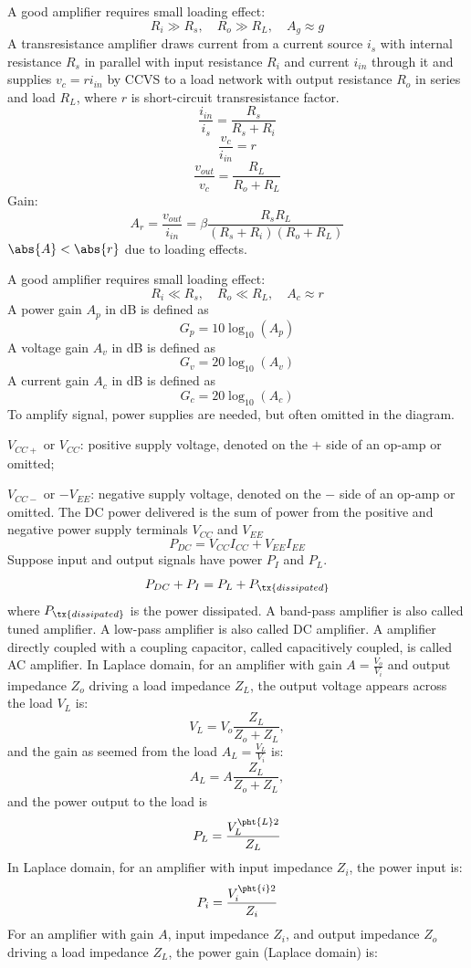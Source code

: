 \documentclass[a4paper,12pt]{report}
\begin{document}
A good amplifier requires small loading effect:
\[R_i\gg R_s,\quad R_o\gg R_L,\quad A_g\approx g\]
A transresistance amplifier draws current from a current source $i_s$ with internal resistance $R_s$ in parallel with input resistance $R_i$ and current $i_{in}$ through it and supplies $v_c=ri_{in}$ by CCVS to a load network with output resistance $R_o$ in series and load $R_L$, where $r$ is short-circuit transresistance factor.
\[\frac{i_{in}}{i_s}=\frac{R_s}{R_s+R_i}\]
\[\frac{v_c}{i_{in}}=r\]
\[\frac{v_{out}}{v_c}=\frac{R_L}{R_o+R_L}\]
Gain:
\[A_r=\frac{v_{out}}{i_{in}}=\beta\frac{R_sR_L}{(R_s+R_i)(R_o+R_L)}\]
$\abs{A}<\abs{r}$ due to loading effects.

A good amplifier requires small loading effect:
\[R_i\ll R_s,\quad R_o\ll R_L,\quad A_c\approx r\]
A power gain $A_p$ in dB is defined as
\[G_p=10\log_{10}(A_p)\]
A voltage gain $A_v$ in dB is defined as
\[G_v=20\log_{10}(A_v)\]
A current gain $A_c$ in dB is defined as
\[G_c=20\log_{10}(A_c)\]
To amplify signal, power supplies are needed, but often omitted in the diagram.
\bit
\item $V_{CC+}$ or $V_{CC}$: positive supply voltage, denoted on the $+$ side of an op-amp or omitted;
\item $V_{CC-}$ or $-V_{EE}$: negative supply voltage, denoted on the $-$ side of an op-amp or omitted.
\eit
The DC power delivered is the sum of power from the positive and negative power supply terminals $V_{CC}$ and $V_{EE}$
\[P_{DC}=V_{CC}I_{CC}+V_{EE}I_{EE}\]
Suppose input and output signals have power $P_I$ and $P_L$.
\[P_{DC}+P_I=P_L+P_{\tx{dissipated}}\]
where $P_{\tx{dissipated}}$ is the power dissipated.
A band-pass amplifier is also called tuned amplifier. A low-pass amplifier is also called DC amplifier. A amplifier directly coupled with a coupling capacitor, called capacitively coupled, is called AC amplifier.
In Laplace domain, for an amplifier with gain $A=\frac{V_o}{V_i}$ and output impedance $Z_o$ driving a load impedance $Z_L$, the output voltage appears across the load $V_L$ is:
\[V_L=V_o\frac{Z_L}{Z_o+Z_L},\]
and the gain as seemed from the load $A_L=\frac{V_L}{V_i}$ is:
\[A_L=A\frac{Z_L}{Z_o+Z_L},\]
and the power output to the load is
\[P_L=\frac{V_L^{\pht{L}2}}{Z_L}\]
In Laplace domain, for an amplifier with input impedance $Z_i$, the power input is:
\[P_i=\frac{V_i^{\pht{i}2}}{Z_i}\]
For an amplifier with gain $A$, input impedance $Z_i$, and output impedance $Z_o$ driving a load impedance $Z_L$, the power gain (Laplace domain) is:
\end{document}
